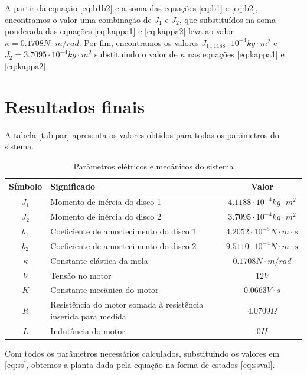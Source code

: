 \documentclass{article}
\begin{document}
A partir da equação \ref{eq:b1b2} e a soma das equações \ref{eq:b1} e \ref{eq:b2}, encontramos o valor uma combinação de $J_1$ e $J_2$, que substituídos na soma ponderada das equações \ref{eq:kappa1} e \ref{eq:kappa2} leva ao valor $\kappa=0.1708N\cdot m/rad$. Por fim, encontramos os valores $J_14.1188\cdot10^{-4}kg\cdot m^2$ e $J_2=3.7095\cdot10^{-4}kg\cdot m^2$ substituindo o valor de $\kappa$ nas equações \ref{eq:kappa1} e \ref{eq:kappa2}.

\section{Resultados finais}
A tabela \ref{tab:par} apresenta os valores obtidos para todas os parâmetros do sistema.
\begin{table}[H]
	\centering
	\caption{Parâmetros elétricos e mecânicos do sistema}
	\label{tab:valores}
	\begin{tabular}{|c|l|c|}
		\hline Símbolo & Significado & Valor \\ 
		\hline $J_1$ & Momento de inércia do disco 1 & $4.1188\cdot10^{-4}kg\cdot m^2$\\ 
		\hline $J_2$ & Momento de inércia do disco 2 & $3.7095\cdot10^{-4}kg\cdot m^2$\\
		\hline $b_1$ & Coeficiente de amortecimento do disco 1 & $4.2052\cdot10^{-5}N\cdot m\cdot s$\\
		\hline $b_2$ & Coeficiente de amortecimento do disco 2 & $9.5110\cdot10^{-4}N\cdot m\cdot s$\\ 	 
		\hline $\kappa$ & Constante elástica da mola & $0.1708N\cdot m/rad$\\ 
		\hline $V$ & Tensão no motor & $12V$\\ 
		\hline $K$ & Constante mecânica do motor & $0.0663 V \cdot s$\\ 
		\hline $R$ & Resistência do motor somada à resistência inserida para medida & $4.0709\Omega$ \\
		\hline $L$ & Indutância do motor & $0H$ \\ 	
		\hline 
	\end{tabular} 
\end{table}

Com todos os parâmetros necessários calculados, substituindo os valores em \ref{eq:ss}, obtemos a planta dada pela equação na forma de estados \ref{eq:ssval}.
\end{document}
